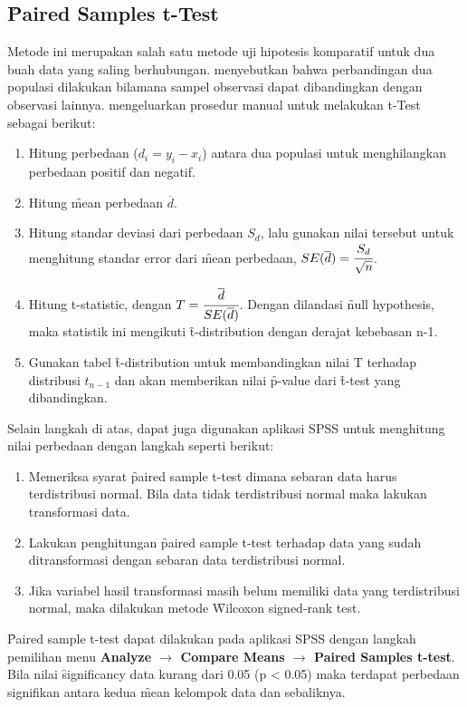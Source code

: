 \subsection{\f{Paired Samples t-Test}}
Metode ini merupakan salah satu metode uji hipotesis komparatif untuk dua buah data yang saling berhubungan. \citet{article.shier} menyebutkan bahwa perbandingan dua populasi dilakukan bilamana sampel observasi dapat dibandingkan dengan observasi lainnya. \citeauthor{article.shier} mengeluarkan prosedur manual untuk melakukan t-Test sebagai berikut:
\begin{enumerate}
	\item Hitung perbedaan ($d_{i} = y_{i}-x_{i}$) antara dua populasi untuk menghilangkan perbedaan positif dan negatif.
	\item Hitung \f{mean} perbedaan $\overline{d}$.
	\item Hitung standar deviasi dari perbedaan $S_{d}$, lalu gunakan nilai tersebut untuk menghitung standar error dari \f{mean} perbedaan, $SE(\overline{d}) = \cfrac{S_{d}}{\sqrt{n}}$.
	\item Hitung t-statistic, dengan $T = \cfrac{\overline{d}}{SE(\overline{d})}$. Dengan dilandasi \f{null hypothesis}, maka statistik ini mengikuti \f{t-distribution} dengan derajat kebebasan n-1.
	\item Gunakan tabel \f{t-distribution} untuk membandingkan nilai T terhadap distribusi $t_{n-1}$ dan akan memberikan nilai \f{p-value} dari \f{t-test} yang dibandingkan.
\end{enumerate}
Selain langkah di atas, dapat juga digunakan aplikasi SPSS untuk menghitung nilai perbedaan dengan langkah seperti berikut:
\begin{enumerate}
	\item Memeriksa syarat \f{paired sample t-test} dimana sebaran data harus terdistribusi normal. Bila data tidak terdistribusi normal maka lakukan transformasi data.
	\item Lakukan penghitungan \f{paired sample t-test} terhadap data yang sudah ditransformasi dengan sebaran data terdistribusi normal.
	\item Jika variabel hasil transformasi masih belum memiliki data yang terdistribusi normal, maka dilakukan metode \f{Wilcoxon signed-rank test}.
\end{enumerate}
\f{Paired sample t-test} dapat dilakukan pada aplikasi SPSS dengan langkah pemilihan menu \textbf{Analyze $\rightarrow$ Compare Means $\rightarrow$ Paired Samples t-test}. Bila nilai \f{significancy} data kurang dari 0.05 (p < 0.05) maka terdapat perbedaan signifikan antara kedua \f{mean} kelompok data dan sebaliknya.
